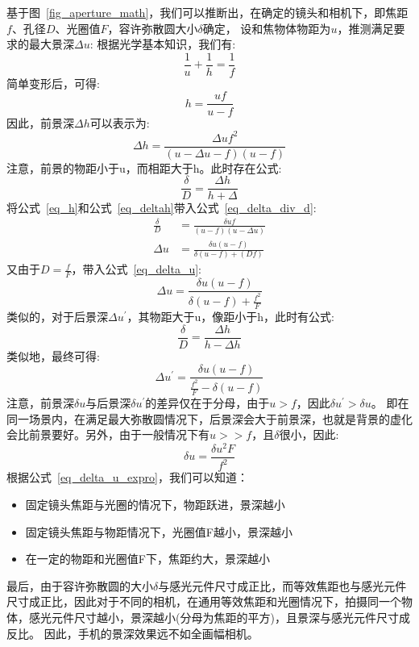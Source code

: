 \documentclass{ctexart}
\begin{document}
基于图~\ref{fig_aperture_math}，我们可以推断出，在确定的镜头和相机下，即焦距$f$、孔径$D$、光圈值$F$，容许弥散圆大小$\delta$确定，
设和焦物体物距为$u$，推测满足要求的最大景深$\Delta u$:
根据光学基本知识，我们有:
\begin{equation}
    \frac{1}{u}+\frac{1}{h} = \frac{1}{f}
\label{eq_fuh}
\end{equation}
简单变形后，可得:
\begin{equation}
    h = \frac{uf}{u-f}
    \label{eq_h}
\end{equation}
因此，前景深$\Delta h$可以表示为:
\begin{equation}
    \Delta h = \frac{\Delta u f^2}{(u-\Delta u -f)(u-f)}
    \label{eq_deltah}
\end{equation}
注意，前景的物距小于u，而相距大于h。此时存在公式:
\begin{equation}
    \frac{\delta}{D} = \frac{\Delta h}{h+\Delta}
    \label{eq_delta_div_d}
\end{equation}
将公式~\ref{eq_h}和公式~\ref{eq_deltah}带入公式~\ref{eq_delta_div_d}:
\begin{align}
    \frac{\delta}{D} &= \frac{\delta uf}{(u-f)(u-\Delta u)} \\
    \Delta u &= \frac{\delta u(u-f)}{\delta(u-f)+(Df)}
    \label{eq_delta_u}
\end{align}
又由于$D=\frac{f}{F}$，带入公式~\ref{eq_delta_u}:
\begin{equation}
    \Delta u = \frac{\delta u(u-f)}{\delta(u-f)+\frac{f^2}{F}}
\end{equation}
类似的，对于后景深$\Delta u^{'}$，其物距大于u，像距小于h，此时有公式:
\begin{equation}
    \frac{\delta}{D} = \frac{\Delta h}{h-\Delta h}
\end{equation}
类似地，最终可得:
\begin{equation}
    \Delta u^{'} = \frac{\delta u(u-f)}{\frac{f^2}{F}-\delta(u-f)}
\end{equation}
注意，前景深$\delta u$与后景深$\delta u^{'}$的差异仅在于分母，由于$u>f$，因此$\delta u^{'}>\delta u$。
即在同一场景内，在满足最大弥散圆情况下，后景深会大于前景深，也就是背景的虚化会比前景要好。另外，由于一般情况下有$u>>f$，且$\delta$很小，因此:
\begin{equation}
    \delta u = \frac{\delta u^{2}F}{f^{2}}
    \label{eq_delta_u_expro}
\end{equation}
根据公式~\ref{eq_delta_u_expro}，我们可以知道：
\begin{itemize}
    \item 固定镜头焦距与光圈的情况下，物距跃进，景深越小
    \item 固定镜头焦距与物距情况下，光圈值F越小，景深越小
    \item 在一定的物距和光圈值F下，焦距约大，景深越小
\end{itemize}
最后，由于容许弥散圆的大小$\delta$与感光元件尺寸成正比，而等效焦距也与感光元件尺寸成正比，因此对于不同的相机，在通用等效焦距和光圈情况下，拍摄同一个物体，感光元件尺寸越小，景深越小(分母为焦距的平方)，且景深与感光元件尺寸成反比。
因此，手机的景深效果远不如全画幅相机。
\end{document}
